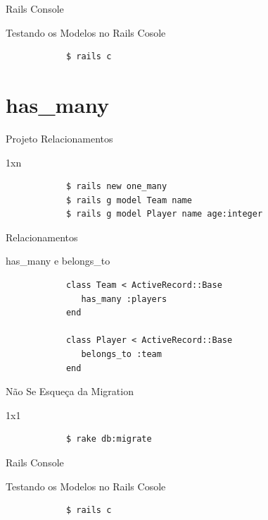 \documentclass{beamer}
\begin{document}
\begin{frame}[fragile]{Rails Console}
	\begin{block} {\LARGE Testando os Modelos no Rails Cosole}
		\begin{verbatim}
			$ rails c
		\end{verbatim}
	\end{block}
\end{frame}


\section{has\_many}
\begin{frame}[fragile]{Projeto Relacionamentos}
	\begin{block} {1xn}
		\begin{verbatim}
		  	$ rails new one_many
		  	$ rails g model Team name 
		  	$ rails g model Player name age:integer
		\end{verbatim}
	\end{block}
\end{frame}

\begin{frame}[fragile]{Relacionamentos}
	\begin{block} {\LARGE has\_many e belongs\_to}
		\begin{verbatim}
		  	class Team < ActiveRecord::Base
		  	   has_many :players
		  	end
		  	
		  	class Player < ActiveRecord::Base
		  	   belongs_to :team
		  	end
		\end{verbatim}
	\end{block}
\end{frame}

\begin{frame}[fragile]{Não Se Esqueça da Migration}
	\begin{block} {1x1}
		\begin{verbatim}
		  	$ rake db:migrate
		\end{verbatim}
	\end{block}
\end{frame}

\begin{frame}[fragile]{Rails Console}
	\begin{block} {\LARGE Testando os Modelos no Rails Cosole}
		\begin{verbatim}
			$ rails c
		\end{verbatim}
	\end{block}
\end{frame}
\end{document}
